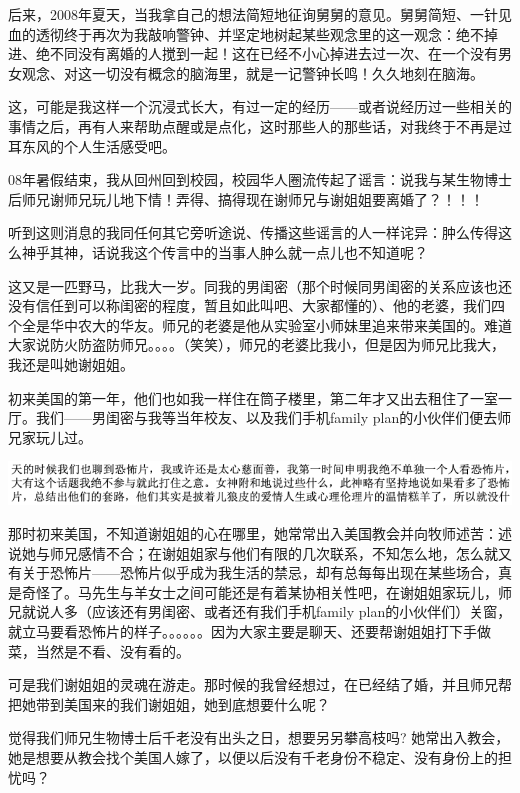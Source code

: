 \documentclass[9pt, b5paper]{article}
\begin{document}
后来，2008年夏天，当我拿自己的想法简短地征询舅舅的意见。舅舅简短、一针见血的透彻终于再次为我敲响警钟、并坚定地树起某些观念里的这一观念：绝不掉进、绝不同没有离婚的人搅到一起！这在已经不小心掉进去过一次、在一个没有男女观念、对这一切没有概念的脑海里，就是一记警钟长鸣！久久地刻在脑海。

这，可能是我这样一个沉浸式长大，有过一定的经历——或者说经历过一些相关的事情之后，再有人来帮助点醒或是点化，这时那些人的那些话，对我终于不再是过耳东风的个人生活感受吧。 

08年暑假结束，我从回州回到校园，校园华人圈流传起了谣言：说我与某生物博士后师兄谢师兄玩儿地下情！弄得、搞得现在谢师兄与谢姐姐要离婚了？！！！

听到这则消息的我同任何其它旁听途说、传播这些谣言的人一样诧异：肿么传得这么神乎其神，话说我这个传言中的当事人肿么就一点儿也不知道呢？

这又是一匹野马，比我大一岁。同我的男闺密（那个时候同男闺密的关系应该也还没有信任到可以称闺密的程度，暂且如此叫吧、大家都懂的）、他的老婆，我们四个全是华中农大的华友。师兄的老婆是他从实验室小师妹里追来带来美国的。难道大家说防火防盗防师兄。。。。（笑笑），师兄的老婆比我小，但是因为师兄比我大，我还是叫她谢姐姐。 

初来美国的第一年，他们也如我一样住在筒子楼里，第二年才又出去租住了一室一厅。我们——男闺密与我等当年校友、以及我们手机family plan的小伙伴们便去师兄家玩儿过。 

\begin{center}
\includegraphics[width=.9\linewidth]{./pic/backups_plans_20210503_134937.png}
\end{center}

那时初来美国，不知道谢姐姐的心在哪里，她常常出入美国教会并向牧师述苦：述说她与师兄感情不合；在谢姐姐家与他们有限的几次联系，不知怎么地，怎么就又有关于恐怖片——恐怖片似乎成为我生活的禁忌，却有总每每出现在某些场合，真是奇怪了。马先生与羊女士之间可能还是有着某协相关性吧，在谢姐姐家玩儿，师兄就说人多（应该还有男闺密、或者还有我们手机family plan的小伙伴们）关窗，就立马要看恐怖片的样子。。。。。。因为大家主要是聊天、还要帮谢姐姐打下手做菜，当然是不看、没有看的。

可是我们谢姐姐的灵魂在游走。那时候的我曾经想过，在已经结了婚，并且师兄帮把她带到美国来的我们谢姐姐，她到底想要什么呢？

觉得我们师兄生物博士后千老没有出头之日，想要另另攀高枝吗? 她常出入教会，她是想要从教会找个美国人嫁了，以便以后没有千老身份不稳定、没有身份上的担忧吗？
\end{document}
